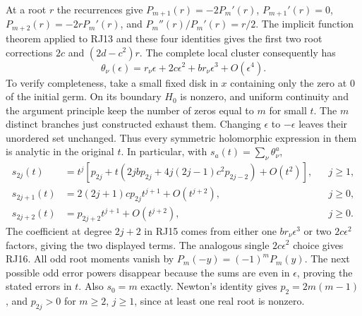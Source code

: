 \documentclass[11pt,a4paper]{article}
\theoremstyle{definition}\newtheorem{definition}[theorem]{Definition}
\begin{document}
At a root $r$ the recurrences give
$P_{m+1}(r)=-2P_m'(r)$,
$P_{m+1}'(r)=0$,
$P_{m+2}(r)=-2rP_m'(r)$, and
$P_m''(r)/P_m'(r)=r/2$.
The implicit function theorem applied to RJ13 and these four
identities gives the first two root corrections $2c$ and
$(2d-c^2)r$. The complete local cluster consequently has
\[
 \theta_\nu(\epsilon)=r_\nu\epsilon+2c\epsilon^2
                   +b r_\nu\epsilon^3+O(\epsilon^4).
 \tag{RJ14}
\]
To verify completeness, take a small fixed disk in $x$ containing
only the zero at $0$ of the initial germ. On its boundary $H_0$
is nonzero, and uniform continuity and the argument principle keep
the number of zeros equal to $m$ for small $t$. The $m$ distinct
branches just constructed exhaust them. Changing $\epsilon$ to
$-\epsilon$ leaves their unordered set unchanged. Thus every
symmetric holomorphic expression in them is analytic in the original
$t$. In particular, with $s_a(t)=\sum_\nu\theta_\nu^a$,
\begin{align}
 s_{2j}(t)&=t^j\left[p_{2j}+t\left(2jb p_{2j}
                 +4j(2j-1)c^2p_{2j-2}\right)+O(t^2)\right],
                       &&j\ge1,\tag{RJ15}\\
 s_{2j+1}(t)&=2(2j+1)c p_{2j}t^{j+1}+O(t^{j+2}),
                       &&j\ge0,\tag{RJ16}\\
 s_{2j+2}(t)&=p_{2j+2}t^{j+1}+O(t^{j+2}),
                       &&j\ge0.\tag{RJ17}
\end{align}
The coefficient at degree $2j+2$ in RJ15 comes from either one
$br_\nu\epsilon^3$ or two $2c\epsilon^2$ factors, giving the
two displayed terms. The analogous single $2c\epsilon^2$ choice
gives RJ16. All odd root moments vanish by $P_m(-y)=(-1)^mP_m(y)$.
The next possible odd error powers disappear because the sums are
even in $\epsilon$, proving the stated errors in $t$. Also $s_0=m$
exactly. Newton's identity gives $p_2=2m(m-1)$, and $p_{2j}>0$
for $m\ge2$, $j\ge1$, since at least one real root is nonzero.
\end{document}
